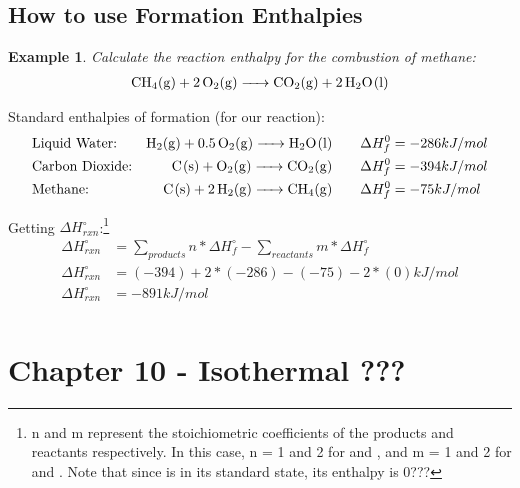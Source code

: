 \documentclass{article}  %
\newtheorem{exmp}{Example}
\begin{document}
\subsection*{How to use Formation Enthalpies}
\begin{exmp}
    Calculate the reaction enthalpy for the combustion of methane:
        \begin{equation*}
            \begin{aligned}
                \ce{CH4_(g) + 2 O2_(g) -> CO2_(g) + 2 H2O_(l)}
            \end{aligned}
        \end{equation*}
\end{exmp}
Standard enthalpies of formation (for our reaction):
\begin{equation*}
    \begin{aligned}
        &\text{Liquid Water:} &\ce{H2_(g) + 0.5 O2_(g) -> H2O_(l)} & \quad & \Delta H^0_f &= -286 kJ/mol \\
        &\text{Carbon Dioxide:} &\ce{C_(s) + O2_(g) -> CO2_(g)} & \quad & \Delta H^0_f &= -394 kJ/mol \\
        &\text{Methane:} &\ce{C_(s) + 2 H2_(g) -> CH4_(g)} & \quad & \Delta H^0_f &= -75 kJ/mol \\
    \end{aligned}
\end{equation*}

Getting $\Delta H^\circ_{rxn}$:\footnote{n and m represent the stoichiometric coefficients of the products and reactants respectively. In this case, n = 1 and 2 for  and , and m = 1 and 2 for  and . Note that since  is in its standard state, its enthalpy is 0???}
\begin{equation*}
    \begin{aligned}
        \Delta H^\circ_{rxn} &= \sum_{products} n * \Delta H^\circ_{f} - \sum_{reactants} m * \Delta H^\circ_{f} \\
        \Delta H^\circ_{rxn} &= (-394) + 2*(-286) - (-75) - 2*(0) kJ/mol \\
        \Delta H^\circ_{rxn} &= -891 kJ/mol \\
    \end{aligned}
\end{equation*}

\section*{Chapter 10 - Isothermal ???}
\end{document}
